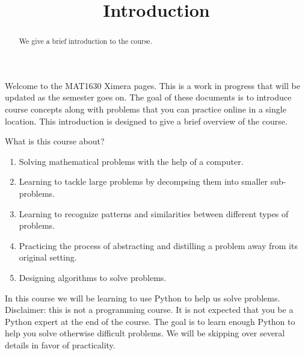 \documentclass{ximera}
\title{Introduction}
\begin{document}
  
\begin{abstract}  
We give a brief introduction to the course.
\end{abstract}  
\maketitle

Welcome to the MAT1630 Ximera pages. This is a work in progress that will be updated as the semester goes on. The goal of these documents is to introduce course concepts along with problems that you can practice online in a single location. 
This introduction is designed to give a brief overview of the course.

What is this course about?

\begin{enumerate}
	\item Solving mathematical problems with the help of a computer.
	\item Learning to tackle large problems by decompsing them into smaller sub-problems.
	\item Learning to recognize patterns and similarities between different types of problems.
	\item Practicing the process of abstracting and distilling a problem away from its original setting.
	\item Designing algorithms to solve problems.
\end{enumerate}

In this course we will be learning to use Python to help us solve problems. Disclaimer: this is not a programming course. It is not expected that you be a Python expert at the end of the course. The goal is to learn enough Python to help you solve otherwise difficult problems. We will be skipping over several details in favor of practicality. 
\end{document}
